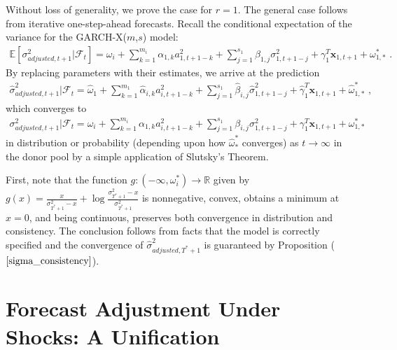 \documentclass{uiucthesis2021}
\newcommand{\x}{\textbf{x}}
\def\E{\mathbb{E}} %
\theoremstyle{definition}
\newenvironment{proof-of-proposition}[1][{}]{\noindent{\bf
    Proof of Proposition {#1}}
  \hspace*{.5em}}{\qed\bigskip\\}
\begin{document}
    \begin{proof-of-proposition}[\ref{sigma_consistency}]
      Without loss of generality, we prove the case for $r = 1$.  The general case follows from iterative one-step-ahead forecasts.  Recall the conditional expectation of the variance for the GARCH-X($m$,$s$) model:
      \begin{align*}
      \E[\sigma^{2}_{adjusted,t+1}|\mathcal{F}_{t}] = \omega_{i} +  \sum^{m_{i}}_{k=1}\alpha_{1,k}a^{2}_{1,t+1-k} + \sum_{j=1}^{s_{1}}\beta_{1,j}\sigma_{1,t+1-j}^{2} + \gamma_{1}^{T} \x_{1,t+1} + \omega^{*}_{1,*} \text{ .}
      \end{align*}
      By replacing parameters with their estimates, we arrive at the prediction 
      \begin{align*}
      \hat\sigma^{2}_{adjusted,t+1}|\mathcal{F}_{t} = \hat\omega_{1} + \sum^{m_{1}}_{k=1}\hat\alpha_{i,k}a^{2}_{i,t+1-k} + \sum_{j=1}^{s_{1}}\hat\beta_{i,j}\hat\sigma_{1,t+1-j}^{2} + \hat\gamma_{1}^{T} \x_{1,t+1} + \hat\omega^{*}_{1,*}\text { ,}
      \end{align*}
      which converges to 
      \begin{align*}
        \sigma^{2}_{adjusted,t+1}|\mathcal{F}_{t} = \omega_{i} + \sum^{m_{i}}_{k=1}\alpha_{1,k}a^{2}_{i,t+1-k} + \sum_{j=1}^{s_{1}}\beta_{i,j}\sigma_{1,t+1-j}^{2} + \gamma_{1}^{T} \x_{1,t+1} + \omega^{*}_{1,*}
        \end{align*}
      in distribution or probability (depending upon how $\hat\omega^{*}_{*}$ converges) as $t\rightarrow\infty$ in the donor pool by a simple application of Slutsky's Theorem.
      \end{proof-of-proposition}

  \begin{proof-of-proposition}[\ref{asymptotic_consistency}]
    First, note that the function $g:(-\infty,\omega_{i}^{*})\rightarrow \mathbb{R}$ given by $g(x) = \frac{x}{\sigma^{2}_{T^{*}+1}-x} + \log{\frac{\sigma_{T^{*}+1}^{2}-x}{\sigma_{T^{*}+1}^{2}} }$ is nonnegative, convex, obtains a minimum at $x = 0$, and being continuous, preserves both convergence in distribution and consistency. The conclusion follows from facts that the model is correctly specified and the convergence of $\hat\sigma^{2}_{adjusted,T^{*}+1}$ is guaranteed by Proposition ($\ref{sigma_consistency}$). 
  \end{proof-of-proposition}

\chapter{Forecast Adjustment Under Shocks: A Unification}
\end{document}
